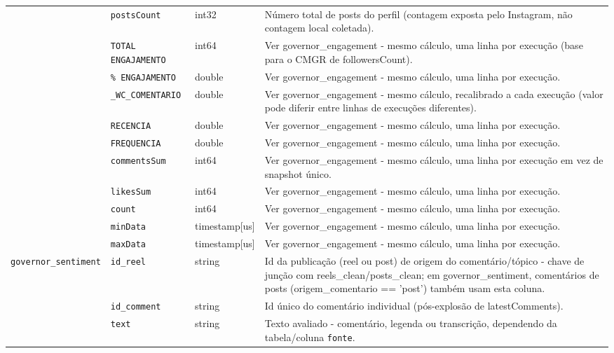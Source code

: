 \begin{footnotesize}
\begin{longtable}{p{3.2cm}p{3.0cm}p{2.0cm}p{6.0cm}}
\texttt{} & \texttt{postsCount} & int32 & Número total de posts do perfil (contagem exposta pelo Instagram, não contagem local coletada). \\
\texttt{} & \texttt{TOTAL ENGAJAMENTO} & int64 & Ver governor\_\allowbreak{}engagement - mesmo cálculo, uma linha por execução (base para o CMGR de followersCount). \\
\texttt{} & \texttt{\% ENGAJAMENTO} & double & Ver governor\_\allowbreak{}engagement - mesmo cálculo, uma linha por execução. \\
\texttt{} & \texttt{\_\allowbreak{}WC\_\allowbreak{}COMENTARIO} & double & Ver governor\_\allowbreak{}engagement - mesmo cálculo, recalibrado a cada execução (valor pode diferir entre linhas de execuções diferentes). \\
\texttt{} & \texttt{RECENCIA} & double & Ver governor\_\allowbreak{}engagement - mesmo cálculo, uma linha por execução. \\
\texttt{} & \texttt{FREQUENCIA} & double & Ver governor\_\allowbreak{}engagement - mesmo cálculo, uma linha por execução. \\
\texttt{} & \texttt{commentsSum} & int64 & Ver governor\_\allowbreak{}engagement - mesmo cálculo, uma linha por execução em vez de snapshot único. \\
\texttt{} & \texttt{likesSum} & int64 & Ver governor\_\allowbreak{}engagement - mesmo cálculo, uma linha por execução. \\
\texttt{} & \texttt{count} & int64 & Ver governor\_\allowbreak{}engagement - mesmo cálculo, uma linha por execução. \\
\texttt{} & \texttt{minData} & timestamp[us] & Ver governor\_\allowbreak{}engagement - mesmo cálculo, uma linha por execução. \\
\texttt{} & \texttt{maxData} & timestamp[us] & Ver governor\_\allowbreak{}engagement - mesmo cálculo, uma linha por execução. \\
\texttt{governor\_\allowbreak{}sentiment} & \texttt{id\_\allowbreak{}reel} & string & Id da publicação (reel ou post) de origem do comentário/\allowbreak{}tópico - chave de junção com reels\_\allowbreak{}clean/\allowbreak{}posts\_\allowbreak{}clean; em governor\_\allowbreak{}sentiment, comentários de posts (origem\_\allowbreak{}comentario == 'post') também usam esta coluna. \\
\texttt{} & \texttt{id\_\allowbreak{}comment} & string & Id único do comentário individual (pós-explosão de latestComments). \\
\texttt{} & \texttt{text} & string & Texto avaliado - comentário, legenda ou transcrição, dependendo da tabela/\allowbreak{}coluna \texttt{fonte}. \\

\end{longtable}
\end{footnotesize}
